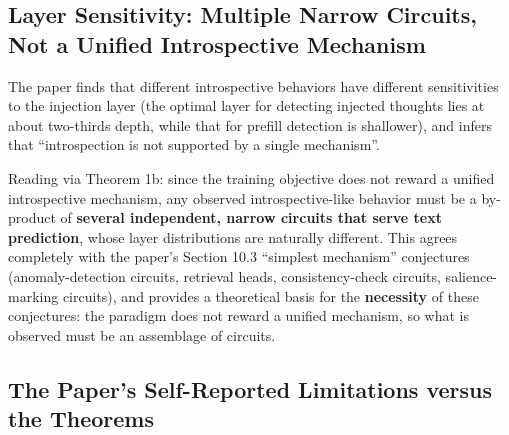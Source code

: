 \subsection{Layer Sensitivity: Multiple Narrow Circuits, Not a Unified Introspective Mechanism}

The paper finds that different introspective behaviors have different sensitivities to the
injection layer (the optimal layer for detecting injected thoughts lies at about two-thirds
depth, while that for prefill detection is shallower)\cite{lindsey-2026-introspection}, and
infers that ``introspection is not supported by a single mechanism''.

Reading via Theorem 1b: since the training objective does not reward a unified introspective
mechanism, any observed introspective-like behavior must be a by-product of \textbf{several
independent, narrow circuits that serve text prediction}, whose layer distributions are
naturally different. This agrees completely with the paper's Section 10.3 ``simplest mechanism''
conjectures (anomaly-detection circuits, retrieval heads, consistency-check circuits,
salience-marking circuits\cite{lindsey-2026-introspection}), and provides a theoretical basis
for the \textbf{necessity} of these conjectures: the paradigm does not reward a unified
mechanism, so what is observed must be an assemblage of circuits.

\subsection{The Paper's Self-Reported Limitations versus the Theorems}

